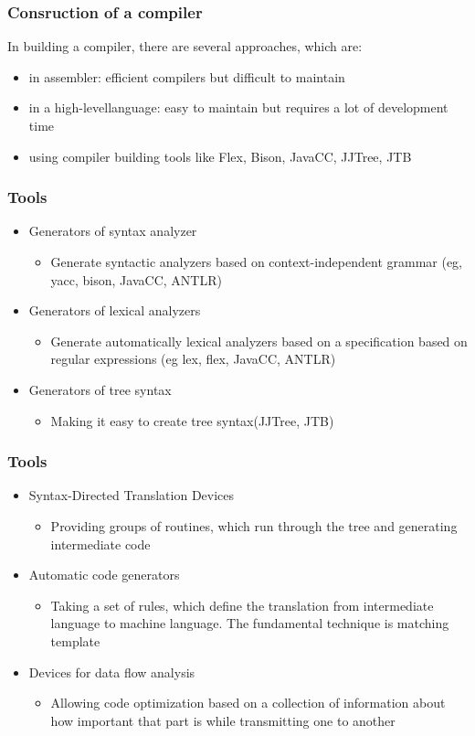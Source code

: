 \documentclass{beamer}
\begin{document}
\begin{frame}
\frametitle{Consruction of a compiler}
In building a compiler, there are several approaches, which are:
\begin{itemize}
\item in assembler: efficient compilers but difficult to maintain
\item in a high-levellanguage: easy to maintain but requires a lot of development time
\item using compiler building tools like Flex, Bison, JavaCC, JJTree, JTB
\end{itemize}
\end{frame}


\begin{frame}
\frametitle{Tools}
\begin{itemize}
\item Generators of syntax analyzer
\begin{itemize}
\item Generate syntactic analyzers based on context-independent grammar (eg, yacc, bison, JavaCC, ANTLR)
\end{itemize}
\item Generators of lexical analyzers
\begin{itemize}
\item Generate automatically lexical analyzers based on a specification based on regular expressions (eg lex, flex, JavaCC, ANTLR)
\end{itemize}
\item Generators of tree syntax
\begin{itemize}
\item Making it easy to create tree syntax(JJTree, JTB)
\end{itemize}
\end{itemize}
\end{frame}


\begin{frame}
\frametitle{Tools}
\begin{itemize}
\item Syntax-Directed Translation Devices
\begin{itemize}
\item Providing groups of routines, which run through the tree and generating intermediate code
\end{itemize}
\item Automatic code generators
\begin{itemize}
\item Taking a set of rules, which define the translation from intermediate language to machine language. The fundamental technique is matching template
\end{itemize}
\item Devices for data flow analysis
\begin{itemize}
\item Allowing code optimization based on a collection of information about how important that part is while transmitting one to another
\end{itemize}
\end{itemize}
\end{frame}
\end{document}
